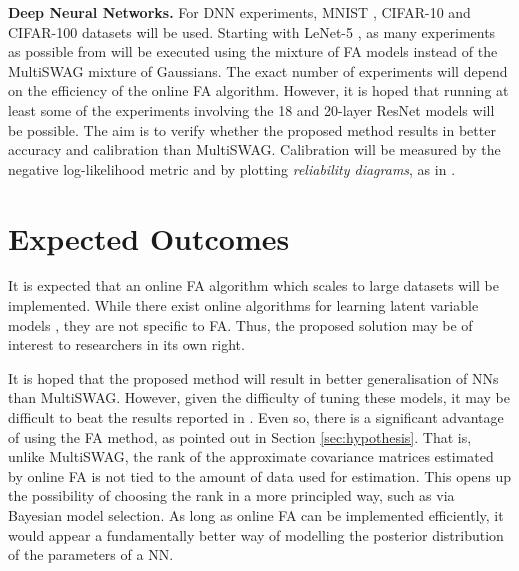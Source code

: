 \documentclass[a4paper,11pt]{article}
\begin{document}
\textbf{Deep Neural Networks. } For DNN experiments, MNIST \cite{deng2012}, CIFAR-10 and CIFAR-100 \cite{krizhevsky09} datasets will be used. Starting with LeNet-5 \cite{lecun1998}, as many experiments as possible from \cite{izmailov2020} will be executed using the mixture of FA models instead of the MultiSWAG mixture of Gaussians. The exact number of experiments will depend on the efficiency of the online FA algorithm. However, it is hoped that running at least some of the experiments involving the 18 and 20-layer ResNet models \cite{he2015} will be possible. The aim is to verify whether the proposed method results in better accuracy and calibration than MultiSWAG. Calibration will be measured by the negative log-likelihood metric and by plotting \emph{reliability diagrams}, as in \cite{maddox2019}.


\section{Expected Outcomes}

It is expected that an online FA algorithm which scales to large datasets will be implemented. While there exist online algorithms for learning latent variable models \cite{kingma2013} \cite{cappe2017}, they are not specific to FA. Thus, the proposed solution may be of interest to researchers in its own right. 

It is hoped that the proposed method will result in better generalisation of NNs than MultiSWAG. However, given the difficulty of tuning these models, it may be difficult to beat the results reported in \cite{izmailov2020}. Even so, there is a significant advantage of using the FA method, as pointed out in Section \ref{sec:hypothesis}. That is, unlike MultiSWAG, the rank of the approximate covariance matrices estimated by online FA is not tied to the amount of data used for estimation. This opens up the possibility of choosing the rank in a more principled way, such as via Bayesian model selection. As long as online FA can be implemented efficiently, it would appear a fundamentally better way of modelling the posterior distribution of the parameters of a NN. 
\end{document}
